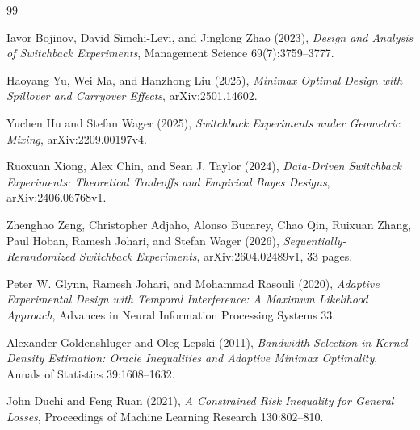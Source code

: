 \documentclass{article}
\begin{document}
\begin{thebibliography}{99}

   Iavor Bojinov, David Simchi-Levi, and Jinglong Zhao (2023), \emph{Design and Analysis of Switchback Experiments}, Management Science 69(7):3759--3777.

   Haoyang Yu, Wei Ma, and Hanzhong Liu (2025), \emph{Minimax Optimal Design with Spillover and Carryover Effects}, arXiv:2501.14602.

   Yuchen Hu and Stefan Wager (2025), \emph{Switchback Experiments under Geometric Mixing}, arXiv:2209.00197v4.

   Ruoxuan Xiong, Alex Chin, and Sean J. Taylor (2024), \emph{Data-Driven Switchback Experiments: Theoretical Tradeoffs and Empirical Bayes Designs}, arXiv:2406.06768v1.

   Zhenghao Zeng, Christopher Adjaho, Alonso Bucarey, Chao Qin, Ruixuan Zhang, Paul Hoban, Ramesh Johari, and Stefan Wager (2026), \emph{Sequentially-Rerandomized Switchback Experiments}, arXiv:2604.02489v1, 33 pages.

   Peter W. Glynn, Ramesh Johari, and Mohammad Rasouli (2020), \emph{Adaptive Experimental Design with Temporal Interference: A Maximum Likelihood Approach}, Advances in Neural Information Processing Systems 33.

   Alexander Goldenshluger and Oleg Lepski (2011), \emph{Bandwidth Selection in Kernel Density Estimation: Oracle Inequalities and Adaptive Minimax Optimality}, Annals of Statistics 39:1608--1632.

   John Duchi and Feng Ruan (2021), \emph{A Constrained Risk Inequality for General Losses}, Proceedings of Machine Learning Research 130:802--810.

\end{thebibliography}
\end{document}
